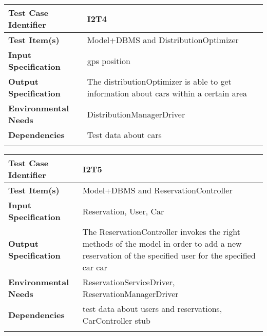\begin{center}
\begin{tabular*}
{\textwidth}
{l p{10.5cm}}

\hline
\textbf{Test Case Identifier} & I2T4 \\
\hline
\textbf{Test Item(s)} &  Model+DBMS and DistributionOptimizer  \\
\hline
\textbf{Input Specification} & gps position\\
\hline
\textbf{Output Specification} & The distributionOptimizer is able to get information about cars within a certain area\\
\hline
\textbf{Environmental Needs} &DistributionManagerDriver\\
\hline
\textbf{Dependencies} &  Test data about cars\\
\hline
\newline
\newline
\end{tabular*}
\end{center}






\begin{center}
\begin{tabular*}
{\textwidth}
{l p{10.5cm}}

\hline
\textbf{Test Case Identifier} & I2T5 \\
\hline
\textbf{Test Item(s)} &  Model+DBMS and ReservationController  \\
\hline
\textbf{Input Specification} & Reservation, User, Car\\
\hline
\textbf{Output Specification} & The ReservationController invokes the right methods of the model in order to add a new reservation of the specified user for the specified car car\\
\hline
\textbf{Environmental Needs} & ReservationServiceDriver, ReservationManagerDriver\\
\hline
\textbf{Dependencies} &  test data about users and reservations, CarController stub\\ %
\hline
\newline
\newline
\end{tabular*}
\end{center}



